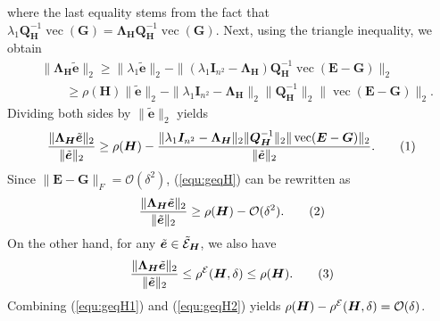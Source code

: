 \documentclass{article}
\def\E{{\cal E}}
\newcommand{\norm}[1]{\|#1\|} %
\newcommand\numberthis{\addtocounter{equation}{1}\tag{\theequation}}
\DeclareMathOperator*{\vect}{vec}
\begin{document}
where the last equality stems from the fact that $\lambda_1 \bm Q^{-1}_{\bm H} \vect(\bm G) = \bm \Lambda_{\bm H} \bm Q^{-1}_{\bm H} \vect(\bm G)$.
Next, using the triangle inequality, we obtain
\begin{align*}
    &\norm{\bm \Lambda_{\bm H} \tilde{\bm e}}_2 \geq \norm{\lambda_1 \tilde{\bm e}}_2 - \norm{(\lambda_1 \bm I_{n^2} - \bm \Lambda_{\bm H}) \bm Q^{-1}_{\bm H} \vect(\bm E - \bm G)}_2 \\ 
    &\qquad \geq \rho(\bm H) \norm{\tilde{\bm e}}_2 - \norm{\lambda_1 \bm I_{n^2} - \bm \Lambda_{\bm H}}_2 \norm{\bm Q^{-1}_{\bm H}}_2 \norm{\vect(\bm E - \bm G)}_2 .
\end{align*}
Dividing both sides by $\norm{\tilde{\bm e}}_2$ yields
\begin{align*}
    \frac{\norm{\bm \Lambda_{\bm H} \tilde{\bm e}}_2}{\norm{\tilde{\bm e}}_2} \geq \rho(\bm H) - \frac{\norm{\lambda_1 \bm I_{n^2} - \bm \Lambda_{\bm H}}_2 \norm{\bm Q^{-1}_{\bm H}}_2 \norm{\vect(\bm E - \bm G)}_2}{\norm{\tilde{\bm e}}_2} . \numberthis \label{equ:geqH}
\end{align*}
Since $\norm{\bm E - \bm G}_F = \mathcal{O}(\delta^2)$, (\ref{equ:geqH}) can be rewritten as
\begin{align*}
    \frac{\norm{\bm \Lambda_{\bm H} \tilde{\bm e}}_2}{\norm{\tilde{\bm e}}_2} \geq \rho(\bm H) - \mathcal{O}(\delta^2) . \numberthis \label{equ:geqH1}
\end{align*}
On the other hand, for any $\tilde{\bm e} \in \tilde{\E}_{\bm H}$, we also have 
\begin{align*}
    \frac{\norm{\bm \Lambda_{\bm H} \tilde{\bm e}}_2}{\norm{\tilde{\bm e}}_2} \leq \rho^{\E}(\bm H,\delta) \leq \rho(\bm H) . \numberthis \label{equ:geqH2}
\end{align*}
Combining (\ref{equ:geqH1}) and (\ref{equ:geqH2}) yields $\rho(\bm H) - \rho^{\E}(\bm H,\delta) = \mathcal{O}(\delta)$.
\end{document}

